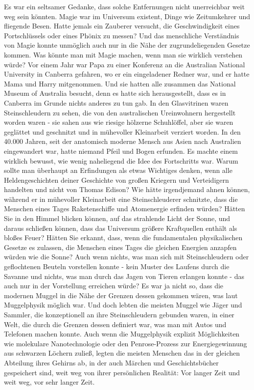 Es war ein seltsamer Gedanke, dass solche Entfernungen nicht unerreichbar weit
weg sein könnten. Magie war im Universum existent, Dinge wie Zeitumkehrer und
fliegende Besen. Hatte jemals ein Zauberer versucht, die Geschwindigkeit eines
Portschlüssels oder eines Phönix zu messen? Und das menschliche Verständnis von
Magie konnte unmöglich auch nur in die Nähe der zugrundeliegenden Gesetze
kommen. Was könnte man mit Magie machen, wenn man sie wirklich verstehen würde?
Vor einem Jahr war Papa zu einer Konferenz an die Australian National University
in Canberra gefahren, wo er ein eingeladener Redner war, und er hatte Mama und
Harry mitgenommen. Und sie hatten alle zusammen das National Museum of Australia
besucht, denn es hatte sich herausgestellt, dass es in Canberra im Grunde nichts
anderes zu tun gab. In den Glasvitrinen waren Steinschleudern zu sehen, die von
den australischen Ureinwohnern hergestellt worden waren - sie sahen aus wie
riesige hölzerne Schuhlöffel, aber sie waren geglättet und geschnitzt und in
mühevoller Kleinarbeit verziert worden. In den 40.000 Jahren, seit der
anatomisch moderne Mensch aus Asien nach Australien eingewandert war, hatte
niemand Pfeil und Bogen erfunden. Es machte einem wirklich bewusst, wie wenig
naheliegend die Idee des Fortschritts war. Warum sollte man überhaupt an
Erfindungen als etwas Wichtiges denken, wenn alle Heldengeschichten deiner
Geschichte von großen Kriegern und Verteidigern handelten und nicht von Thomas
Edison? Wie hätte irgendjemand ahnen können, während er in mühevoller
Kleinarbeit eine Steinschleuderer schnitzte, dass die Menschen eines Tages
Raketenschiffe und Atomenergie erfinden würden? Hätten Sie in den Himmel blicken
können, auf das strahlende Licht der Sonne, und daraus schließen können, dass
das Universum größere Kraftquellen enthält als bloßes Feuer? Hätten Sie erkannt,
dass, wenn die fundamentalen physikalischen Gesetze es zulassen, die Menschen
eines Tages die gleichen Energien anzapfen würden wie die Sonne? Auch wenn
nichts, was man sich mit Steinschleudern oder geflochtenen Beuteln vorstellen
konnte - kein Muster des Laufens durch die Savanne und nichts, was man durch das
Jagen von Tieren erlangen konnte - das auch nur in der Vorstellung erreichen
würde? Es war ja nicht so, dass die modernen Muggel in die Nähe der Grenzen
dessen gekommen wären, was laut Muggelphysik möglich war. Und doch lebten die
meisten Muggel wie Jäger und Sammler, die konzeptionell an ihre Steinschleudern
gebunden waren, in einer Welt, die durch die Grenzen dessen definiert war, was
man mit Autos und Telefonen machen konnte. Auch wenn die Muggelphysik explizit
Möglichkeiten wie molekulare Nanotechnologie oder den Penrose-Prozess zur
Energiegewinnung aus schwarzen Löchern zuließ, legten die meisten Menschen das
in der gleichen Abteilung ihres Gehirns ab, in der auch Märchen und
Geschichtsbücher gespeichert sind, weit weg von ihrer persönlichen Realität: Vor
langer Zeit und weit weg, vor sehr langer Zeit.

